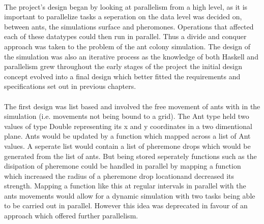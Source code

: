 \documentclass[main.tex]{subfiles}
\begin{document}
\paragraph{}The project's design began by looking at parallelism from a high level, as it is important to parallelize tasks a seperation on the data level was decided on, between ants, the simulations surface and pheromones. Operations that affected each of these datatypes could then run in parallel. Thus a divide and conquer approach was taken to the problem of the ant colony simulation. The design of the simulation was also an iterative process as the knowledge of both Haskell and parallelism grew throughout the early stages of the project the initial design concept evolved into a final design which better fitted the requirements and specifications set out in previous chapters.

\paragraph{}The first design was list based and involved the free movement of ants with in the simulation (i.e. movements not being bound to a grid). The Ant type held two values of type Double representing its x and y coordinates in a two dimentional plane. Ants would be updated by a function which mapped across a list of Ant values. A seperate list would contain a list of pheremone drops which would be generated from the list of ants. But being stored seperately functions such as the disipation of pheremone could be handled in parallel by mapping a function which increased the radius of a pheremone drop locationand decreased its strength. Mapping a function like this at regular intervals in parallel with the ants movements would allow for a dynamic simulation with two tasks being able to be carried out in parallel. However this idea was deprecated in favour of an approach which offered further parallelism.

\end{document}
